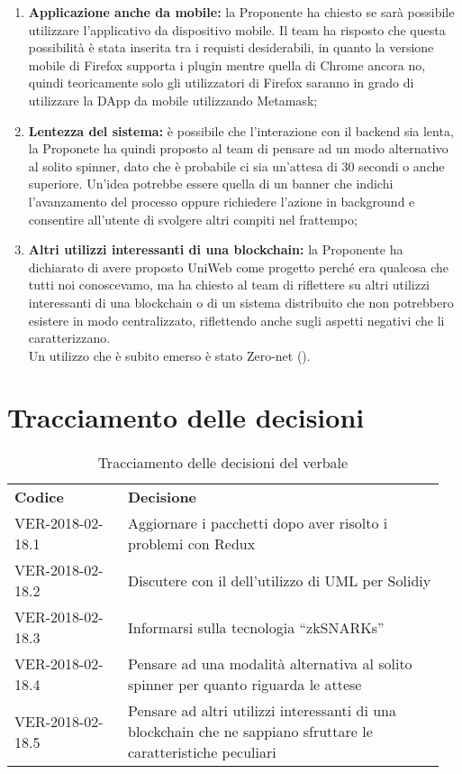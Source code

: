 \documentclass[VER-2018-01-09.tex]{subfiles}
\begin{document}
\begin{enumerate}
	\item \textbf{Applicazione anche da mobile:} la Proponente ha chiesto se sarà possibile utilizzare l'applicativo da dispositivo mobile. Il team ha risposto che questa possibilità è stata inserita tra i requisti desiderabili, in quanto la versione mobile di Firefox supporta i plugin mentre quella di Chrome ancora no, quindi teoricamente solo gli utilizzatori di Firefox saranno in grado di utilizzare la DApp da mobile utilizzando Metamask;
	\item \textbf{Lentezza del sistema:} è possibile che l'interazione con il backend sia lenta, la Proponete ha quindi proposto al team di pensare ad un modo alternativo al solito spinner, dato che è probabile ci sia un'attesa di 30 secondi o anche superiore. Un'idea potrebbe essere quella di un banner che indichi l'avanzamento del processo oppure richiedere l'azione in background e consentire all'utente di svolgere altri compiti nel frattempo;
	\item \textbf{Altri utilizzi interessanti di una blockchain:} la Proponente ha dichiarato di avere proposto UniWeb come progetto perché era qualcosa che tutti noi conoscevamo, ma ha chiesto al team di riflettere su altri utilizzi interessanti di una blockchain o di un sistema distribuito che non potrebbero esistere in modo centralizzato, riflettendo anche sugli aspetti negativi che li caratterizzano.\\ Un utilizzo che è subito emerso è stato Zero-net ().
\end{enumerate}

\section{Tracciamento delle decisioni}
\begin{table}[H]
	\begin{center}
		\begin{tabu} to 
			\tableHeaderStyle
			\textbf{Codice} & \textbf{Decisione} \\
			VER-2018-02-18.1 & Aggiornare i pacchetti dopo aver risolto i problemi con Redux \\
			VER-2018-02-18.2 & Discutere con il \Vardanega dell'utilizzo di UML per Solidiy \\
			VER-2018-02-18.3 & Informarsi sulla tecnologia \textquotedblleft zkSNARKs\textquotedblright \\
			VER-2018-02-18.4 & Pensare ad una modalità alternativa al solito spinner per quanto riguarda le attese \\
			VER-2018-02-18.5 & Pensare ad altri utilizzi interessanti di una blockchain che ne sappiano sfruttare le caratteristiche peculiari \\
		\end{tabu}
	\caption{Tracciamento delle decisioni del verbale}
	\end{center}
\end{table}
\end{document}
